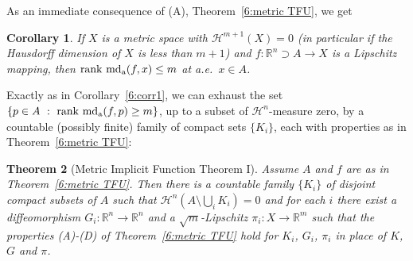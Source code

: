 \documentclass[12pt,leqno]{amsart}
\newtheorem{theorem}{Theorem}
\newtheorem{corollary}[theorem]{Corollary}
\theoremstyle{definition}
\newcommand{\bbbr}{\mathbb R}
\def\H{{\mathcal H}}
\def\rank{{\rm rank\,}}
\def\md{\operatorname{md}}
\def\apmd{\operatorname{md_{\rm a}}}
\numberwithin{theorem}{section} \numberwithin{equation}{section}
\begin{document}
As an immediate consequence of (A), Theorem~\ref{6:metric TFU}, we get
\begin{corollary}
\label{IT1}
If $X$ is a metric space with $\H^{m+1}(X)=0$ (in particular if the Hausdorff dimension of $X$ is less than $m+1$) and $f\colon \bbbr^n \supset A \to X$ is a Lipschitz mapping, then $\rank \apmd(f,x) \leq m$ at a.e.\ $x \in A$.
\end{corollary}




Exactly as in Corollary~\ref{6:corr1}, we can exhaust the set $\{p\in A~:~\rank \apmd(f,p)\geq m\}$, up to a subset of $\H^n$-measure zero, by a countable (possibly finite) family of compact sets $\{K_i\}$, each with properties as in  Theorem~\ref{6:metric TFU}:

\begin{theorem}[Metric Implicit Function Theorem I]
\label{6:corr2}
Assume $A$ and $f$ are as in Theorem~\ref{6:metric TFU}.
Then there is a countable family $\{K_i\}$ of disjoint compact subsets of $A$ such that
$\H^n(A\setminus\bigcup_i K_i)=0$ and for each $i$ there exist a diffeomorphism $G_i:\bbbr^n\to\bbbr^n$ and a $\sqrt{m}$-Lipschitz $\pi_i:X\to\bbbr^m$ such that the properties (A)-(D) of Theorem~\ref{6:metric TFU} hold for $K_i$, $G_i$, $\pi_i$ in place of $K$, $G$ and $\pi$.
\end{theorem}
\end{document}
